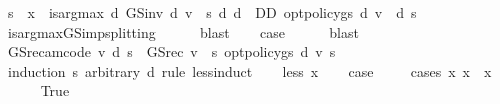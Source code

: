 \begin{isabellebody}
\ {\isachardoublequoteopen}s\ {\isasymle}\ x\ {\isasymLongrightarrow}\ is{\isacharunderscore}{\kern0pt}arg{\isacharunderscore}{\kern0pt}max\ {\isacharparenleft}{\kern0pt}{\isasymlambda}d{\isachardot}{\kern0pt}\ GS{\isacharunderscore}{\kern0pt}inv\ d\ v\ {\isachardollar}{\kern0pt}\ s{\isacharparenright}{\kern0pt}\ {\isacharparenleft}{\kern0pt}{\isasymlambda}d{\isachardot}{\kern0pt}\ d\ {\isasymin}\ D\isactrlsub D{\isacharparenright}{\kern0pt}\ {\isacharparenleft}{\kern0pt}opt{\isacharunderscore}{\kern0pt}policy{\isacharunderscore}{\kern0pt}gs{\isacharprime}{\kern0pt}\ d\ v{\isacharparenright}{\kern0pt}{\isachardoublequoteclose}\ \ d\ s\isanewline
\ \ \ \ \isamarkupfalse%
\ is{\isacharunderscore}{\kern0pt}arg{\isacharunderscore}{\kern0pt}max{\isacharunderscore}{\kern0pt}GS{\isacharunderscore}{\kern0pt}imp{\isacharunderscore}{\kern0pt}splitting{\isacharprime}{\kern0pt}\isanewline
\ \ \ \ \isamarkupfalse%
\ blast\isanewline
\ \ \isamarkupfalse%
\ {\isacharquery}{\kern0pt}case\isanewline
\ \ \ \ \isamarkupfalse%
\ blast\isanewline
{}\isamarkupfalse%
%
\endisatagproof
{\isafoldproof}%
%
\isadelimproof
\isanewline
%
\endisadelimproof
\isanewline
{}\isamarkupfalse%
\ {\isachardoublequoteopen}GS{\isacharunderscore}{\kern0pt}rec{\isacharunderscore}{\kern0pt}am{\isacharunderscore}{\kern0pt}code\ v\ d\ s\ {\isacharequal}{\kern0pt}\ {\isacharparenleft}{\kern0pt}GS{\isacharunderscore}{\kern0pt}rec\ v\ {\isachardollar}{\kern0pt}\ s{\isacharcomma}{\kern0pt}\ opt{\isacharunderscore}{\kern0pt}policy{\isacharunderscore}{\kern0pt}gs{\isacharprime}{\kern0pt}\ d\ v\ s{\isacharparenright}{\kern0pt}{\isachardoublequoteclose}\isanewline
%
\isadelimproof
%
\endisadelimproof
%
\isatagproof
{}\isamarkupfalse%
\ {\isacharparenleft}{\kern0pt}induction\ s\ arbitrary{\isacharcolon}{\kern0pt}\ d\ rule{\isacharcolon}{\kern0pt}\ less{\isacharunderscore}{\kern0pt}induct{\isacharparenright}{\kern0pt}\isanewline
\ \ \isamarkupfalse%
\ {\isacharparenleft}{\kern0pt}less\ x{\isacharparenright}{\kern0pt}\isanewline
\ \ \isamarkupfalse%
\ {\isacharquery}{\kern0pt}case\ \isanewline
\ \ \isamarkupfalse%
\ {\isacharparenleft}{\kern0pt}cases\ {\isachardoublequoteopen}{\isasymexists}x{\isacharprime}{\kern0pt}{\isachardot}{\kern0pt}\ x{\isacharprime}{\kern0pt}\ {\isacharless}{\kern0pt}\ x{\isachardoublequoteclose}{\isacharparenright}{\kern0pt}\isanewline
\ \ \ \ \isamarkupfalse%
\ True\isanewline
\ \ \ \ \isamarkupfalse%

\end{isabellebody}

